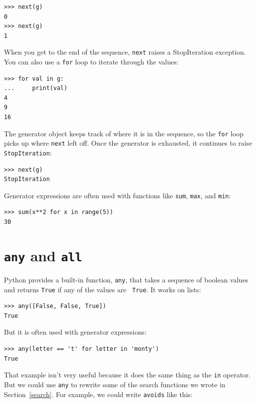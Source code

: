 \documentclass[10pt]{book}
\begin{document}
\begin{verbatim}
>>> next(g)
0
>>> next(g)
1
\end{verbatim}
%
When you get to the end of the sequence, {\tt next} raises a
StopIteration exception.  You can also use a {\tt for} loop to iterate
through the values:

\begin{verbatim}
>>> for val in g:
...     print(val)
4
9
16
\end{verbatim}
%
The generator object keeps track of where it is in the sequence,
so the {\tt for} loop picks up where {\tt next} left off.  Once the
generator is exhausted, it continues to raise {\tt StopIteration}:

\begin{verbatim}
>>> next(g)
StopIteration
\end{verbatim}

Generator expressions are often used with functions like {\tt sum},
{\tt max}, and {\tt min}:

\begin{verbatim}
>>> sum(x**2 for x in range(5))
30
\end{verbatim}


\section{{\tt any} and {\tt all}}

Python provides a built-in function, {\tt any}, that takes a sequence
of boolean values and returns {\tt True} if any of the values are {\tt
  True}.  It works on lists:

\begin{verbatim}
>>> any([False, False, True])
True
\end{verbatim}
%
But it is often used with generator expressions:

\begin{verbatim}
>>> any(letter == 't' for letter in 'monty')
True
\end{verbatim}
%
That example isn't very useful because it does the same thing
as the {\tt in} operator.  But we could use {\tt any} to rewrite
some of the search functions we wrote in Section~\ref{search}.  For
example, we could write {\tt avoids} like this:
\end{document}
